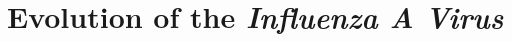 \begin{figure}[!hbt]
    \label{fig:Cycle}
\end{figure}



\section{Evolution of the \textit{Influenza A Virus}}

